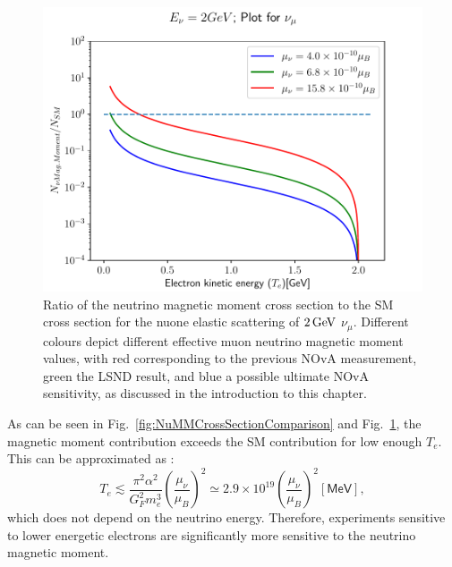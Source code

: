 \begin{figure}[hbtp]
\centering
\includegraphics[width=.9\textwidth]{Plots/NuMM/RatioNumuMMCompLinX.pdf}
\caption[Ratio of the neutrino magnetic moment and the Standard Model cross sections]{Ratio of the neutrino magnetic moment cross section to the \acrshort{SM} cross section for the \acrshort{nuone} elastic scattering of $\unit[2]{GeV}$ $\nu_\mu$. Different colours depict different effective muon neutrino magnetic moment values, with red corresponding to the previous \acrshort{NOvA} measurement, green the LSND result, and blue a possible ultimate \acrshort{NOvA} sensitivity, as discussed in the introduction to this chapter.}
\label{fig:NuMMCrossSectionRatios}
\end{figure}

As can be seen in Fig.~\ref{fig:NuMMCrossSectionComparison} and Fig.~\ref{fig:NuMMCrossSectionRatios}, the magnetic moment contribution exceeds the \gls{SM} contribution for low enough $T_e$. This can be approximated as \cite{nuElmagInt2015.pdf}:
\begin{equation}
T_e\lesssim\frac{\pi^2\alpha^2}{G_F^2m_e^3}\left(\frac{\mu_{\nu}}{\mu_B}\right)^2\simeq 2.9\times 10^{19}\left(\frac{\mu_{\nu}}{\mu_B}\right)^2\left[\textsf{MeV}\right],
\end{equation}
which does not depend on the neutrino energy. Therefore, experiments sensitive to lower energetic electrons are significantly more sensitive to the neutrino magnetic moment.


